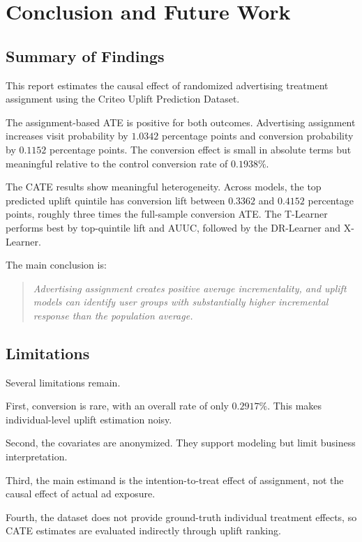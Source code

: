 \documentclass[journal,11pt,onecolumn]{IEEEtran}
\begin{document}
\section{Conclusion and Future Work}

\subsection{Summary of Findings}

This report estimates the causal effect of randomized advertising treatment assignment using the Criteo Uplift Prediction Dataset.

The assignment-based ATE is positive for both outcomes. Advertising assignment increases visit probability by \(1.0342\) percentage points and conversion probability by \(0.1152\) percentage points. The conversion effect is small in absolute terms but meaningful relative to the control conversion rate of \(0.1938\%\).

The CATE results show meaningful heterogeneity. Across models, the top predicted uplift quintile has conversion lift between \(0.3362\) and \(0.4152\) percentage points, roughly three times the full-sample conversion ATE. The T-Learner performs best by top-quintile lift and AUUC, followed by the DR-Learner and X-Learner.

The main conclusion is:

\begin{quote}
    \emph{Advertising assignment creates positive average incrementality, and uplift models can identify user groups with substantially higher incremental response than the population average.}
\end{quote}

\subsection{Limitations}

Several limitations remain.

First, conversion is rare, with an overall rate of only \(0.2917\%\). This makes individual-level uplift estimation noisy.

Second, the covariates are anonymized. They support modeling but limit business interpretation.

Third, the main estimand is the intention-to-treat effect of assignment, not the causal effect of actual ad exposure.

Fourth, the dataset does not provide ground-truth individual treatment effects, so CATE estimates are evaluated indirectly through uplift ranking.
\end{document}
